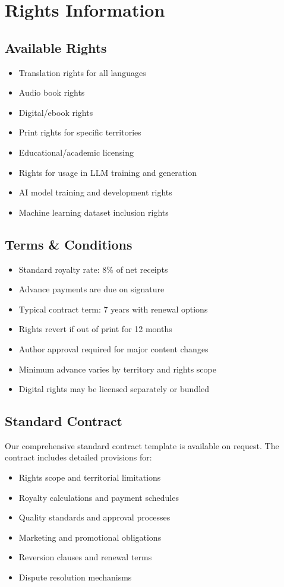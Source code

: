 \documentclass[11pt]{article}
\begin{document}
\vspace{0.5cm}

\newpage

\section{Rights Information}

\subsection{Available Rights}
\begin{itemize}
\item Translation rights for all languages
\item Audio book rights
\item Digital/ebook rights
\item Print rights for specific territories
\item Educational/academic licensing
\item Rights for usage in LLM training and generation
\item AI model training and development rights
\item Machine learning dataset inclusion rights
\end{itemize}

\subsection{Terms \& Conditions}
\begin{itemize}
\item Standard royalty rate: 8\% of net receipts
\item Advance payments are due on signature
\item Typical contract term: 7 years with renewal options
\item Rights revert if out of print for 12 months
\item Author approval required for major content changes
\item Minimum advance varies by territory and rights scope
\item Digital rights may be licensed separately or bundled
\end{itemize}

\subsection{Standard Contract}
Our comprehensive standard contract template is available on request. The contract includes detailed provisions for:
\begin{itemize}
\item Rights scope and territorial limitations
\item Royalty calculations and payment schedules
\item Quality standards and approval processes
\item Marketing and promotional obligations
\item Reversion clauses and renewal terms
\item Dispute resolution mechanisms
\end{itemize}
\end{document}
